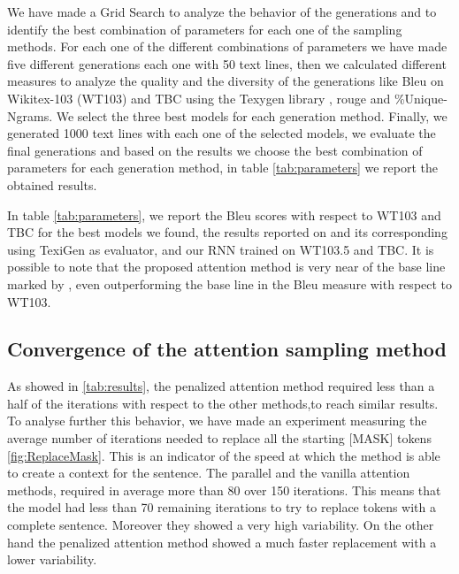 \documentclass[10pt,twocolumn,letterpaper]{article}
\begin{document}

We have made a Grid Search to analyze the behavior of the generations and to identify the best combination of parameters for each one of the sampling methods.
For each one of the different combinations of parameters we have made five different generations each one with 50 text lines,
then we calculated different measures to analyze the quality and the diversity of the generations like
Bleu on Wikitex-103 (WT103) and TBC using the Texygen library \cite{texygen}, rouge and \%Unique-Ngrams. We select the three best models for each
generation method. Finally, we generated 1000 text lines with each one
of the selected models, we evaluate the final generations and based on the results we choose the best combination of
parameters for each generation method, in table \ref{tab:parameters} we report the obtained results.

In table \ref{tab:parameters}, we report the Bleu scores with respect to WT103 and TBC for the best models we found,
the results reported on \cite{wang2019bert} and its corresponding using TexiGen as evaluator, and our RNN trained on WT103.5 and TBC.
It is possible to note that the proposed attention method is very near of the base line marked by \cite{wang2019bert},
even outperforming the base line in the Bleu measure with respect to WT103.


\subsection{Convergence of the attention sampling method}
As showed in \ref{tab:results}, the penalized attention method required less than a half
of the iterations with respect to the other methods,to reach similar results.
To analyse further this behavior, we have made an experiment measuring the average number
of iterations needed to replace all the starting [MASK] tokens \ref{fig:ReplaceMask}.
This is an indicator of the speed at which the method is able to create a context for the sentence.
The parallel and the vanilla attention methods, required in average more than 80 over 150 iterations.
This means that the model had less than 70 remaining iterations to try to replace tokens with a complete sentence.
Moreover they showed a very high variability.
On the other hand the penalized attention method showed a much faster replacement with a lower variability.
\end{document}
